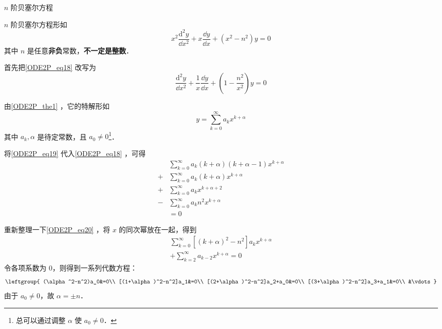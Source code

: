 




\begin{example}{$n$ 阶贝塞尔方程}\label{ODE2P_ex4}

$n$ 阶贝塞尔方程形如
\begin{equation}\label{ODE2P_eq18}
x^2\frac{\mathrm{d}^2 y}{\dd x^2}+x\frac{\dd y}{\dd x}+(x^2-n^2)y=0
\end{equation}
其中 $n$ 是任意\textbf{非负}常数，\textbf{不一定是整数}．

首先把\autoref{ODE2P_eq18} 改写为
\begin{equation}
\frac{\mathrm{d}^2 y}{\dd x^2}+\frac{1}{x}\frac{\dd y}{\dd x}+(1-\frac{n^2}{x^2})y=0
\end{equation}

由\autoref{ODE2P_the1} ，它的特解形如
\begin{equation}\label{ODE2P_eq19}
y=\sum\limits_{k=0}^\infty a_kx^{k+\alpha}
\end{equation}
其中 $a_k, \alpha$ 是待定常数，且 $a_0\neq 0$\footnote{总可以通过调整 $\alpha$ 使 $a_0\neq 0$．}．

将\autoref{ODE2P_eq19} 代入\autoref{ODE2P_eq18} ，可得
\begin{equation}\label{ODE2P_eq20}
\begin{aligned}
&\sum\limits^\infty_{k=0}a_k(k+\alpha)(k+\alpha-1)x^{k+\alpha}\\+
&\sum\limits^\infty_{k=0}a_k(k+\alpha)x^{k+\alpha}\\+
&\sum\limits^\infty_{k=0}a_kx^{k+\alpha+2}\\-
&\sum\limits^\infty_{k=0}a_kn^2x^{k+\alpha}\\
&=0
\end{aligned}
\end{equation}

重新整理一下\autoref{ODE2P_eq20} ，将 $x$ 的同次幂放在一起，得到
\begin{equation}
\begin{aligned}
\sum\limits^\infty_{k=0}[(k+\alpha)^2-n^2]a_kx^{k+\alpha}\\
+\sum\limits^\infty_{k=2}a_{k-2}x^{k+\alpha}=0
\end{aligned}
\end{equation}
令各项系数为 $0$，则得到一系列代数方程：
\begin{equation}\label{ODE2P_eq21}
\leftgroup{
    (\alpha^2-n^2)a_0&=0\\
    [(1+\alpha)^2-n^2]a_1&=0\\
    [(2+\alpha)^2-n^2]a_2+a_0&=0\\
    [(3+\alpha)^2-n^2]a_3+a_1&=0\\
    &\vdots
}
\end{equation}
由于 $a_0\neq 0$，故 $\alpha=\pm n$．


\end{example}
